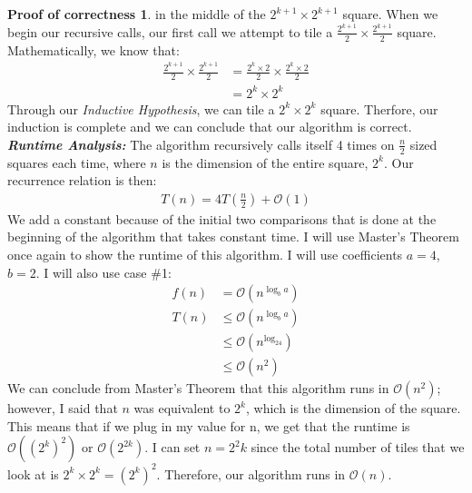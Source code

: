 \documentclass[11pt]{article}
\theoremstyle{definition}
\newtheorem*{proofoc}{Proof of correctness}
\begin{document}
\begin{enumerate}
\begin{proofoc}
    in the middle of the $2^{k+1} \times 2^{k+1}$ square. When we begin our recursive calls, our first call we attempt to tile a $\frac{2^{k+1}}{2} \times \frac{2^{k+1}}{2}$ square.
    Mathematically, we know that:
    \begin{align*}
        \frac{2^{k+1}}{2} \times \frac{2^{k+1}}{2} & = \frac{2^k\times 2}{2} \times \frac{2^k\times 2}{2} \\
        & = 2^k \times 2^k
    \end{align*}
    Through our \textit{Inductive Hypothesis}, we can tile a $2^k \times 2^k$ square. Therfore, our induction is complete and we can conclude that our algorithm is correct. \\[1em]
    \textbf{\textit{Runtime Analysis: }}The algorithm recursively calls itself 4 times on $\frac{n}{2}$ sized squares each time, where $n$ is the dimension of the entire square, $2^k$. Our recurrence relation is then: 
    \begin{align*}
        T(n) = 4T(\frac{n}{2}) + \mathcal{O}(1)
    \end{align*}
    We add a constant because of the initial two comparisons that is done at the beginning of the algorithm that takes constant time. I will use Master's Theorem once again to show the runtime of 
    this algorithm. I will use coefficients $a=4$, $b=2$. I will also use case \#1:  
    \begin{align*}
        f(n) &= \mathcal{O}(n^{\log_ba}) \\
        T(n) & \leq \mathcal{O}(n^{\log_ba}) \\
        & \leq \mathcal{O}(n^{\log_24}) \\
        & \leq \mathcal{O}(n^2)
    \end{align*}
    We can conclude from Master's Theorem that this algorithm runs in $\mathcal{O}(n^2)$; however, I said that $n$ was equivalent to $2^k$, which is the dimension of the square. 
    This means that if we plug in my value for n, we get that the runtime is $\mathcal{O}((2^k)^2)$ or $\mathcal{O}(2^{2k})$. I can set $n = 2^2k$ since the total number of 
    tiles that we look at is $2^k \times 2^k = (2^k)^2$. Therefore, our algorithm runs in $\mathcal{O}(n)$. 
\end{proofoc}
\newpage
\end{enumerate}
\end{document}
